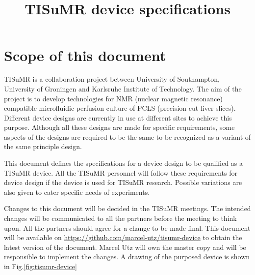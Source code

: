 \documentclass[11pt]{article}
\begin{document}
\author{}
\title{TISuMR device specifications}
\maketitle

\section{Scope of this document}
TISuMR is a collaboration project between University of Southampton, University of Groningen and Karlsruhe Institute of Technology. The aim of the project is to develop technologies for NMR (nuclear magnetic resonance) compatible microfluidic perfusion culture of PCLS (precision cut liver slices). Different device designs are currently in use at different sites to achieve this purpose. Although all these designs are made for specific requirements, some aspects of the designs are required to be the same to be recognized as a variant of the same principle design.

This document defines the specifications for a device design to be qualified as a TISuMR device. All the TISuMR personnel will follow these requirements for device design if the device is used for TISuMR research. Possible variations are also given to cater specific needs of experiments.

Changes to this document will be decided in the TISuMR meetings. The intended changes will be communicated to all the partners before the meeting to think upon. All the partners should agree for a change to be made final. This document will be available on \url{https://github.com/marcel-utz/tisumr-device} to obtain the latest version of the document. Marcel Utz will own the master copy and will be responsible to implement the changes. A drawing of the purposed device is shown in Fig.\ref{fig:tisumr-device}
\end{document}
